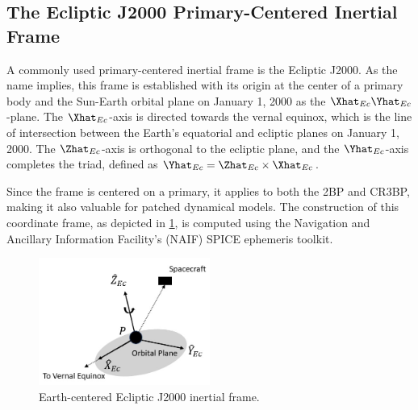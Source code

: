 \subsection{The Ecliptic J2000 Primary-Centered Inertial Frame}
A commonly used primary-centered inertial frame is the Ecliptic J2000. As the name implies, this
frame is established with its origin at the center of a primary body and the Sun-Earth orbital
plane on January 1, 2000 as the $\Xhat_{Ec}\Yhat_{Ec}$-plane. The $\Xhat_{Ec}$-axis is directed
towards the vernal equinox, which is the line of intersection between the Earth's equatorial and
ecliptic planes on January 1, 2000. The $\Zhat_{Ec}$-axis is orthogonal to the ecliptic plane, and
the $\Yhat_{Ec}$-axis completes the triad, defined as $\Yhat_{Ec}=\Zhat_{Ec}\times\Xhat_{Ec}$.

Since the frame is centered on a primary, it applies to both the 2BP and CR3BP, making it also
valuable for patched dynamical models. The construction of this coordinate frame, as depicted in
\cref{fig:eclipJ2000Frame}, is computed using the Navigation and Ancillary Information
Facility's (NAIF) SPICE ephemeris toolkit\cite{Semenov:2023}.

\begin{figure}[ht]
    \centering
    \includegraphics[width=0.5\textwidth]{figures/EclipJ2000Frame.jpg}
    \caption{Earth-centered Ecliptic J2000 inertial frame.}
    \label{fig:eclipJ2000Frame}
\end{figure}
